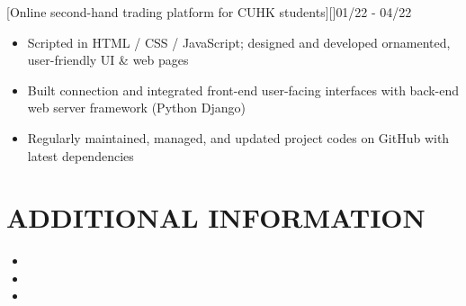 \documentclass[cmu]{resume}
\begin{document}

    [Online second-hand trading platform for CUHK students][\href{https://github.com/1155141394/CuSell}{\githubIcon}]{01/22 - 04/22}
    \begin{itemize}
        \item Scripted in HTML / CSS / JavaScript; designed and developed ornamented, user-friendly UI \& web pages
        \item Built connection and integrated front-end user-facing interfaces with back-end web server framework (Python Django)
        \item Regularly maintained, managed, and updated project codes on GitHub with latest dependencies
    \end{itemize}
    \section{ADDITIONAL INFORMATION}
    \begin{itemize}
        \item {}
        \item {}
        \item {}
    \end{itemize}
\end{document}
